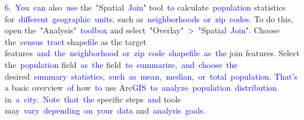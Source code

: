 \documentclass{article}
\begin{document}
\begin{tcolorbox}[colframe=black,colback=white]
{}\textcolor{blue}{6}\textcolor{blue}{.}\textcolor{blue}{~You}\textcolor{blue}{~can} also\textcolor{blue}{~use} the\textcolor{blue}{~"}Spatial\textcolor{blue}{~Join}" tool\textcolor{blue}{~to} calculate\textcolor{blue}{~population} statistics for\textcolor{blue}{~different}\textcolor{blue}{~geographic}\textcolor{blue}{~units}\textcolor{blue}{,} such as\textcolor{blue}{~neighborhoods}\textcolor{blue}{~or}\textcolor{blue}{~zip}\textcolor{blue}{~codes}. To do this\textcolor{blue}{,} open the\textcolor{blue}{~"}Analysis"\textcolor{blue}{~toolbox} and select\textcolor{blue}{~"}Overlay"\textcolor{blue}{~>}\textcolor{blue}{~"}Spatial\textcolor{blue}{~Join}". Choose the\textcolor{blue}{~census}\textcolor{blue}{~tract} shape\textcolor{blue}{file} as the target features\textcolor{blue}{~and}\textcolor{blue}{~the}\textcolor{blue}{~neighborhood}\textcolor{blue}{~or}\textcolor{blue}{~zip}\textcolor{blue}{~code}\textcolor{blue}{~shape}\textcolor{blue}{file}\textcolor{blue}{~as}\textcolor{blue}{~the} join features\textcolor{blue}{.} Select the\textcolor{blue}{~population} field\textcolor{blue}{~as}\textcolor{blue}{~the} field\textcolor{blue}{~to}\textcolor{blue}{~summarize},\textcolor{blue}{~and}\textcolor{blue}{~choose}\textcolor{blue}{~the} desired\textcolor{blue}{~summary}\textcolor{blue}{~statistics}\textcolor{blue}{,}\textcolor{blue}{~such}\textcolor{blue}{~as}\textcolor{blue}{~mean},\textcolor{blue}{~median}\textcolor{blue}{,}\textcolor{blue}{~or}\textcolor{blue}{~total}\textcolor{blue}{~population}\textcolor{blue}{.
}\textcolor{blue}{That}\textcolor{blue}{'s} a basic overview\textcolor{blue}{~of} how\textcolor{blue}{~to} use Arc\textcolor{blue}{GIS}\textcolor{blue}{~to}\textcolor{blue}{~analyze}\textcolor{blue}{~population}\textcolor{blue}{~distribution} in\textcolor{blue}{~a}\textcolor{blue}{~city}\textcolor{blue}{.}\textcolor{blue}{~Note}\textcolor{blue}{~that}\textcolor{blue}{~the} specific steps\textcolor{blue}{~and} tools may\textcolor{blue}{~vary}\textcolor{blue}{~depending}\textcolor{blue}{~on}\textcolor{blue}{~your}\textcolor{blue}{~data} and\textcolor{blue}{~analysis}\textcolor{blue}{~goals}\textcolor{blue}{.}\textcolor{blue}{}
\end{tcolorbox}
\end{document}
